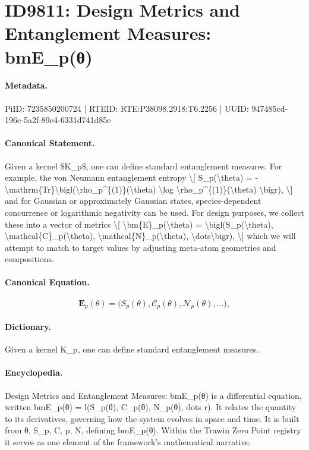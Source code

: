 \section*{ID9811: Design Metrics and Entanglement Measures: bmE\_p(θ)}
\paragraph{Metadata.}
PiID: 7235850200724 | RTEID: RTE:P38098.2918:T6.2256 | UUID: 947485cd-196e-5a2f-89e4-6331d741d85e

\paragraph{Canonical Statement.}
Given a kernel \$K\_p\$, one can define standard entanglement measures. For example, the von Neumann entanglement entropy \textbackslash{}[ S\_p(\textbackslash{}theta) = -\textbackslash{}mathrm\{Tr\}\textbackslash{}bigl(\textbackslash{}rho\_p\textasciicircum{}\{(1)\}(\textbackslash{}theta) \textbackslash{}log \textbackslash{}rho\_p\textasciicircum{}\{(1)\}(\textbackslash{}theta) \textbackslash{}bigr), \textbackslash{}] and for Gaussian or approximately Gaussian states, species-dependent concurrence or logarithmic negativity can be used. For design purposes, we collect these into a vector of metrics \textbackslash{}[ \textbackslash{}bm\{E\}\_p(\textbackslash{}theta) = \textbackslash{}bigl(S\_p(\textbackslash{}theta), \textbackslash{}mathcal\{C\}\_p(\textbackslash{}theta), \textbackslash{}mathcal\{N\}\_p(\textbackslash{}theta), \textbackslash{}dots\textbackslash{}bigr), \textbackslash{}] which we will attempt to match to target values by adjusting meta-atom geometries and compositions.

\paragraph{Canonical Equation.}
\[
\bm{E}_p(\theta) = \bigl(S_p(\theta), \mathcal{C}_p(\theta), \mathcal{N}_p(\theta), \dots\bigr),
\]

\paragraph{Dictionary.}
Given a kernel K\_p, one can define standard entanglement measures.

\paragraph{Encyclopedia.}
Design Metrics and Entanglement Measures: bmE\_p(θ) is a differential equation, written bmE\_p(θ) = l(S\_p(θ), C\_p(θ), N\_p(θ), dots r). It relates the quantity to its derivatives, governing how the system evolves in space and time. It is built from θ, S\_p, C, p, N, defining bmE\_p(θ). Within the Trawin Zero Point registry it serves as one element of the framework's mathematical narrative.
